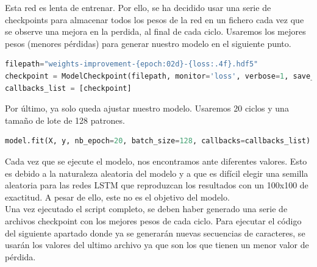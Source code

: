 Esta red es lenta de entrenar. Por ello, se ha decidido usar una serie de checkpoints para almacenar todos los pesos de la red en un fichero cada vez que se observe una mejora en la perdida, al final de cada ciclo. Usaremos los mejores pesos (menores pérdidas) para generar nuestro modelo en el siguiente punto.
\begin{lstlisting}[language=Python]
filepath="weights-improvement-{epoch:02d}-{loss:.4f}.hdf5"
checkpoint = ModelCheckpoint(filepath, monitor='loss', verbose=1, save_best_only=True, mode='min')
callbacks_list = [checkpoint]
\end{lstlisting}
Por último, ya solo queda ajustar nuestro modelo. Usaremos 20 ciclos y una tamaño de lote de 128 patrones.
\begin{lstlisting}[language=Python]
model.fit(X, y, nb_epoch=20, batch_size=128, callbacks=callbacks_list)
\end{lstlisting}
Cada vez que se ejecute el modelo, nos encontramos ante diferentes valores. Esto es debido a la naturaleza aleatoria del modelo y a que es difícil elegir una semilla aleatoria para las redes LSTM que reproduzcan los resultados con un 100x100 de exactitud. A pesar de ello, este no es el objetivo del modelo.\\
Una vez ejecutado el script completo, se deben haber generado una serie de archivos checkpoint con los mejores pesos de cada ciclo. Para ejecutar el código del siguiente apartado donde ya se generarán nuevas secuencias de caracteres, se usarán los valores del ultimo archivo ya que son los que tienen un menor valor de pérdida.

